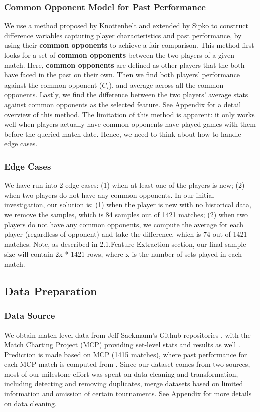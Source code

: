 \documentclass[paper=a4, fontsize=11pt]{scrartcl} %
\numberwithin{equation}{section} %
\numberwithin{figure}{section} %
\numberwithin{table}{section} %
\begin{document}
\subsubsection{Common Opponent Model for Past Performance}
We use a method proposed by Knottenbelt \cite{KNOTTENBELT20123820} and extended by Sipko \cite{tennis1} to construct difference variables capturing player characteristics and past performance, by using their \textbf{common opponents} to achieve a fair comparison. 
This method first looks for a set of \textbf{common opponents} between the two players of a given match. Here, \textbf{common opponents} are defined as other players that the both have faced in the past on their own. Then we find both players' performance against the common opponent ($C_i$), and average across all the common opponents. Lastly, we find the difference between the two players' average stats against common opponents as the selected feature.  See Appendix for a detail overview of this method.
The limitation of this method is apparent: it only works well when players actually have common opponents have played games with them before the queried match date. Hence, we need to think about how to handle edge cases.
\subsubsection{Edge Cases}
We have run into 2 edge cases: (1) when at least one of the players is new; (2) when two players do not have any common opponents.  In our initial investigation, our solution is: (1) when the player is new with no historical data, we remove the samples, which is 84 samples out of 1421 matches; (2) when two players do not have any common opponents, we compute the average for each player (regardless of opponent) and take the difference, which is 74 out of 1421 matches. Note, as described in 2.1.Feature Extraction section, our final sample size will contain 2x * 1421 rows, where x is the number of sets played in each match.
\subsection{Data Preparation}
\subsubsection{Data Source}
We obtain match-level data from Jeff Sackmann's Github repositories \cite{tennis_atp} \cite{tennis_charting}, with the Match Charting Project (MCP) providing set-level stats and results as well \cite{tennis_charting}. Prediction is made based on MCP (1415 matches), where past performance for each MCP match is computed from \cite{tennis_atp}. Since our dataset comes from two sources, most of our milestone effort was spent on data cleaning and transformation, including detecting and removing duplicates, merge datasets based on limited information and omission of certain tournaments.  See Appendix for more details on data cleaning.
\end{document}

